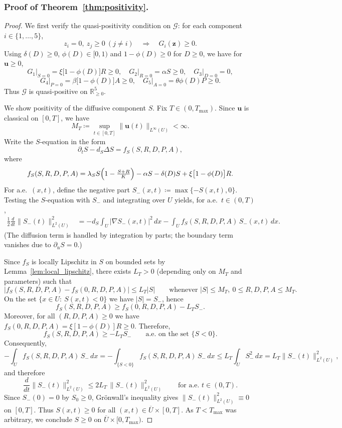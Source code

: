 \documentclass[pdflatex,sn-mathphys-ay]{sn-jnl}
\theoremstyle{thmstyleone}
\theoremstyle{definition}
\theoremstyle{remark}
\begin{document}
\subsubsection{Proof of Theorem~\ref{thm:positivity}.}
\begin{proof}
We first verify the quasi-positivity condition on $\mathcal{G}$: for each component $i\in\{1,\dots,5\}$,
\begin{equation}
\label{eq:quasi_positivity_def}
z_i=0,\ z_j\ge0\ (j\neq i)\quad \Longrightarrow\quad G_i(\mathbf{z})\ge0.
\end{equation}
Using $\delta(D)\ge 0$, $\phi(D)\in[0,1)$ and $1-\phi(D)\ge 0$ for $D\ge 0$, we have for $\mathbf u\ge 0$,
\[
G_1\big|_{S=0}=\xi\bigl[1-\phi(D)\bigr]R\ge 0,\quad
G_2\big|_{R=0}=\alpha S\ge 0,\quad
G_3\big|_{D=0}=0,
\]
\[
G_4\big|_{P=0}=\beta\bigl[1-\phi(D)\bigr]A\ge 0,\quad
G_5\big|_{A=0}=\theta\phi(D)P\ge 0.
\]
Thus $\mathcal G$ is quasi-positive on $\mathbb R_{\ge 0}^5$.

We show positivity of the diffusive component $S$.
Fix $T\in(0,T_{\max})$.
Since $\mathbf u$ is classical on $[0,T]$, we have
\[
M_T \coloneqq \sup_{t\in[0,T]}\|\mathbf u(t)\|_{L^\infty(U)} < \infty.
\]
Write the $S$-equation in the form
\[
\partial_t S - d_S\Delta S = f_S(S,R,D,P,A),
\]
where
\[
f_S(S,R,D,P,A)
=\lambda_S S\Bigl(1-\tfrac{S+R}{K}\Bigr)-\alpha S-\delta(D)S+\xi\bigl[1-\phi(D)\bigr]R.
\]
For a.e.\ $(x,t)$, define the negative part $S_-(x,t)\coloneqq \max\{-S(x,t),0\}$.
Testing the $S$-equation with $S_-$ and integrating over $U$ yields, for a.e.\ $t\in(0,T)$,
\begin{align*}
\frac12\frac{d}{dt}\|S_-(t)\|_{L^2(U)}^2
&= -d_S\int_U |\nabla S_-(x,t)|^2\,dx - \int_U f_S(S,R,D,P,A)\,S_-(x,t)\,dx.
\end{align*}
(The diffusion term is handled by integration by parts; the boundary term vanishes due to $\partial_{\mathrm n}S=0$.)

Since $f_S$ is locally Lipschitz in $S$ on bounded sets by Lemma~\ref{lem:local_lipschitz}, there exists $L_T>0$
(depending only on $M_T$ and parameters) such that
\[
|f_S(S,R,D,P,A)-f_S(0,R,D,P,A)|\le L_T |S|
\qquad\text{whenever }|S|\le M_T,\ 0\le R,D,P,A\le M_T.
\]
On the set $\{x\in U:\ S(x,t)<0\}$ we have $|S|=S_-$, hence
\[
f_S(S,R,D,P,A)\ge f_S(0,R,D,P,A)-L_T S_-.
\]
Moreover, for all $(R,D,P,A)\ge0$ we have $f_S(0,R,D,P,A)=\xi[1-\phi(D)]R\ge0$.
Therefore,
\[
f_S(S,R,D,P,A)\ge -L_T S_-
\qquad\text{a.e.\ on the set }\{S<0\}.
\]
Consequently,
\[
-\int_U f_S(S,R,D,P,A)\,S_-\,dx
= -\int_{\{S<0\}} f_S(S,R,D,P,A)\,S_-\,dx
\le L_T\int_U S_-^2\,dx  = L_T\|S_-(t)\|_{L^2(U)}^2,
\]
and therefore
\[
\frac{d}{dt}\|S_-(t)\|_{L^2(U)}^2 \le 2L_T\,\|S_-(t)\|_{L^2(U)}^2
\qquad\text{for a.e.\ }t\in(0,T).
\]
Since $S_-(0)=0$ by $S_0\ge 0$, Gr\"onwall's inequality gives $\|S_-(t)\|_{L^2(U)}^2\equiv 0$ on $[0,T]$.
Thus $S(x,t)\ge 0$ for all $(x,t)\in \overline U\times[0,T]$.
As $T<T_{\max}$ was arbitrary, we conclude $S\ge 0$ on $\overline U\times[0,T_{\max})$.


\end{proof}
\end{document}
